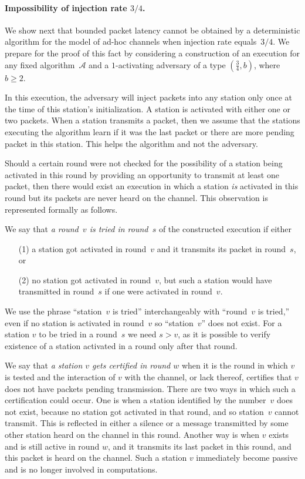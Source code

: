\documentclass[11pt]{article}
\newcommand{\BBB}{\vspace*{-\bigskipamount}}
\newcommand{\cA}{{\mathcal A}}
\newcommand{\Paragraph}[1]{\BBB\paragraph{#1}}
\begin{document}
\Paragraph{Impossibility of injection rate $3/4$.}


We show next that bounded packet latency cannot be obtained by a deterministic algorithm for the model of ad-hoc channels when injection rate equals~$3/4$.
We prepare for the proof of this fact by considering a construction of an execution for any fixed algorithm~$\cA$ and a $1$-activating adversary of a type $(\frac{3}{4},b)$, where $b\ge 2$.	



In this execution, the adversary will inject packets into any station only once at the time of this station's initialization.
A station is activated with either one or two packets.
When a station transmits a packet, then we assume that the stations executing the algorithm learn if it was the last packet or there are more pending packet in this station. 
This helps the algorithm and not the adversary.

Should a certain round were not checked for the possibility of a station being activated in this round by providing an opportunity to transmit at least one packet, then there would exist an execution in which a station \emph{is} activated in this round but its packets are never heard on the channel.
This observation is represented formally as follows.

We say that \emph{a round~$v$ is tried in round~$s$} of the  constructed execution if either 
\begin{enumerate}
\item[(1)] a station got activated in round~$v$ and it transmits its packet in round~$s$, or 

\item[(2)] no station got activated in round~$v$, but such a station would have transmitted in round~$s$ if one were activated in  round~$v$.
\end{enumerate}
We use the phrase ``station~$v$ is tried'' interchangeably with ``round~$v$ is tried,'' even if no station is activated in round~$v$ so ``station~$v$'' does not exist.
For a station $v$ to be tried in a round~$s$ we need $s > v$, as it is possible to verify existence of a station activated in a round only after that round.

We say that \emph{a station $v$ gets certified in round $w$} when it is the round in which $v$ is tested and the interaction of $v$ with the channel, or lack thereof, certifies that $v$ does not have  packets pending transmission. 
There are two ways in which such a certification could occur. 
One is when a station identified by the number~$v$ does not exist, because no station got activated in that round, and so station~$v$ cannot transmit.
This is reflected in either a silence or a message transmitted by some other station heard on the channel in this round.
Another way is when $v$ exists and is still active in round $w$, and it transmits its last packet in this round, and  this packet is heard on the channel.
Such a station $v$ immediately become passive and is no longer involved in computations.
\end{document}
